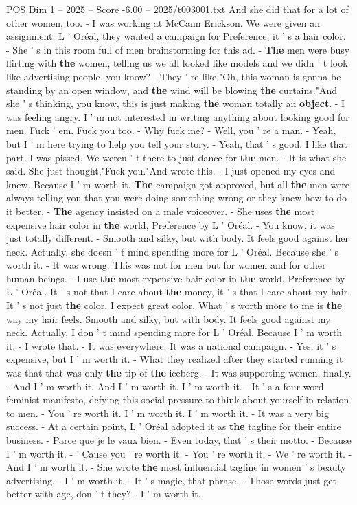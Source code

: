 \begin{textsample}{POS Dim 1 – 2025 – Score -6.00 – 2025/t003001.txt}
And she did that for a lot of other women, too. - I was working at McCann Erickson.
We were given an assignment.
L ' Oréal, they wanted a campaign for Preference, it ' s a hair color. - She ' s in this room full of men brainstorming for this ad. - \textbf{The} men were busy flirting with \textbf{the} women, telling us we all looked like models and we didn ' t look like advertising people, you know? - They ' re like,"Oh, this woman is gonna be standing by an open window, and \textbf{the} wind will be blowing \textbf{the} curtains."And she ' s thinking, you know, this is just making \textbf{the} woman totally an \textbf{object}. - I was feeling angry.
I ' m not interested in writing anything about looking good for men.
Fuck ' em.
Fuck you too. - Why fuck me? - Well, you ' re a man. - Yeah, but I ' m here trying to help you tell your story. - Yeah, that ' s good.
I like that part.
I was pissed.
We weren ' t there to just dance for \textbf{the} men. - It is what she said.
She just thought,"Fuck you."And wrote this. - I just opened my eyes and knew.
Because I ' m worth it. \textbf{The} campaign got approved, but all \textbf{the} men were always telling you that you were doing something wrong or they knew how to do it better. - \textbf{The} agency insisted on a male voiceover. - She uses \textbf{the} most expensive hair color in \textbf{the} world, Preference by L ' Oréal. - You know, it was just totally different. - Smooth and silky, but with body.
It feels good against her neck.
Actually, she doesn ' t mind spending more for L ' Oréal.
Because she ' s worth it. - It was wrong.
This was not for men but for women and for other human beings. - I use \textbf{the} most expensive hair color in \textbf{the} world, Preference by L ' Oréal.
It ' s not that I care about \textbf{the} money, it ' s that I care about my hair.
It ' s not just \textbf{the} color, I expect great color.
What ' s worth more to me is \textbf{the} way my hair feels.
Smooth and silky, but with body.
It feels good against my neck.
Actually, I don ' t mind spending more for L ' Oréal.
Because I ' m worth it. - I wrote that. - It was everywhere.
It was a national campaign. - Yes, it ' s expensive, but I ' m worth it. - What they realized after they started running it was that that was only \textbf{the} tip of \textbf{the} iceberg. - It was supporting women, finally. - And I ' m worth it.
And I ' m worth it.
I ' m worth it. - It ' s a four-word feminist manifesto, defying this social pressure to think about yourself in relation to men. - You ' re worth it.
I ' m worth it.
I ' m worth it. - It was a very big success. - At a certain point, L ' Oréal adopted it as \textbf{the} tagline for their entire business. - Parce que je le vaux bien. - Even today, that ' s their motto. - Because I ' m worth it. - ' Cause you ' re worth it. - You ' re worth it. - We ' re worth it. - And I ' m worth it. - She wrote \textbf{the} most influential tagline in women ' s beauty advertising. - I ' m worth it. - It ' s magic, that phrase. - Those words just get better with age, don ' t they? - I ' m worth it.

\end{textsample}
